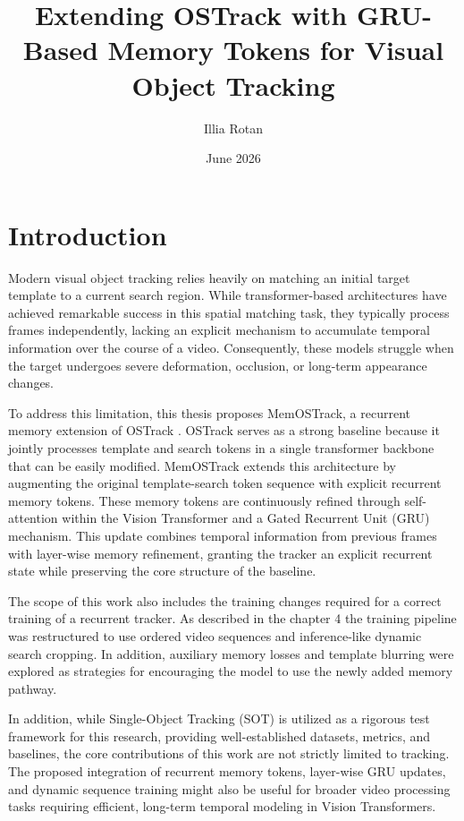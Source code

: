 \documentclass[bachelorthesis]{fer}
\title{Extending OSTrack with GRU-Based Memory Tokens for Visual Object Tracking}
\author{Illia Rotan}
\date{June 2026}
\numberwithin{equation}{chapter}
\begin{document}
    \frontmatter
    \tableofcontents
    \mainmatter

    \chapter*{Introduction}

    Modern visual object tracking relies heavily on matching an initial target template to a current search region. While transformer-based architectures have achieved remarkable success in this spatial matching task, they typically process frames independently, lacking an explicit mechanism to accumulate temporal information over the course of a video. Consequently, these models struggle when the target undergoes severe deformation, occlusion, or long-term appearance changes.

    To address this limitation, this thesis proposes MemOSTrack, a recurrent memory extension of OSTrack \cite{ye2022ostrack}. OSTrack serves as a strong baseline because it jointly processes template and search tokens in a single transformer backbone that can be easily modified. MemOSTrack extends this architecture by augmenting the original template-search token sequence with explicit recurrent memory tokens. These memory tokens are continuously refined through self-attention within the Vision Transformer and a Gated Recurrent Unit (GRU) \cite{cho2014gru} mechanism. This update combines temporal information from previous frames with layer-wise memory refinement, granting the tracker an explicit recurrent state while preserving the core structure of the baseline.

    The scope of this work also includes the training changes required for a correct training of a recurrent tracker. As described in the chapter 4 the training pipeline was restructured to use ordered video sequences and inference-like dynamic search cropping. In addition, auxiliary memory losses and template blurring were explored as strategies for encouraging the model to use the newly added memory pathway.

    In addition, while Single-Object Tracking (SOT) is utilized as a rigorous test framework for this research, providing well-established datasets, metrics, and baselines, the core contributions of this work are not strictly limited to tracking. The proposed integration of recurrent memory tokens, layer-wise GRU updates, and dynamic sequence training might also be useful for broader video processing tasks requiring efficient, long-term temporal modeling in Vision Transformers.
\end{document}
